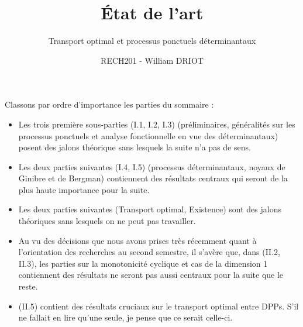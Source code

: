 \documentclass[12pt]{article}
\begin{document}

\title{\textbf{État de l'art}}
\author{Transport optimal et processus ponctuels déterminantaux}
\date{RECH201 - William DRIOT}

\vfill 

\maketitle

\vfill

\newpage


\tableofcontents


\newpage

Classons par ordre d'importance les parties du sommaire :

\begin{itemize}

  \item Les trois première sous-parties (I.1, I.2, I.3) (préliminaires, généralités sur les processus ponctuels et analyse fonctionnelle en vue des déterminantaux) posent des jalons théorique sans lesquels la suite n'a pas de sens.

  \item Les deux parties suivantes (I.4, I.5) (processus déterminantaux, noyaux de Ginibre et de Bergman) contiennent des résultats centraux qui seront de la plus haute importance pour la suite.

  \item Les deux parties suivantes (Transport optimal, Existence) sont des jalons théoriques sans lesquels on ne peut pas travailler. 
  
  \item Au vu des décisions que nous avons prises très récemment quant à l'orientation des recherches au second semestre, il s'avère que, dans (II.2, II.3), les parties sur la monotonicité cyclique et cas de la dimension 1 contiennent des résultats ne seront pas aussi centraux pour la suite que le reste.

  \item (II.5) contient des résultats cruciaux sur le transport optimal entre DPPs. S'il ne fallait en lire qu'une seule, je pense que ce serait celle-ci.

\end{itemize}
\end{document}
